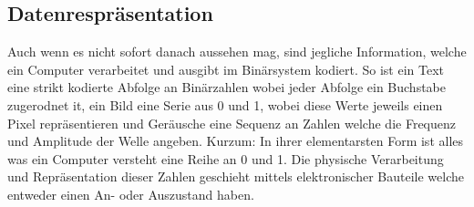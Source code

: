 \documentclass{article}
\begin{document}
	\subsection{Datenrespräsentation}
	Auch wenn es nicht sofort danach aussehen mag, sind jegliche Information, welche ein Computer verarbeitet und ausgibt im Binärsystem kodiert. So ist ein Text eine strikt kodierte Abfolge an Binärzahlen wobei jeder Abfolge ein Buchstabe zugerodnet it, ein Bild eine Serie aus 0 und 1, wobei diese Werte jeweils einen Pixel repräsentieren und Geräusche eine Sequenz an Zahlen welche die Frequenz und Amplitude der Welle angeben. Kurzum: In ihrer elementarsten Form ist alles was ein Computer versteht eine Reihe an 0 und 1. Die physische Verarbeitung und Repräsentation dieser Zahlen geschieht mittels elektronischer Bauteile welche entweder einen An- oder Auszustand haben.
\end{document}
